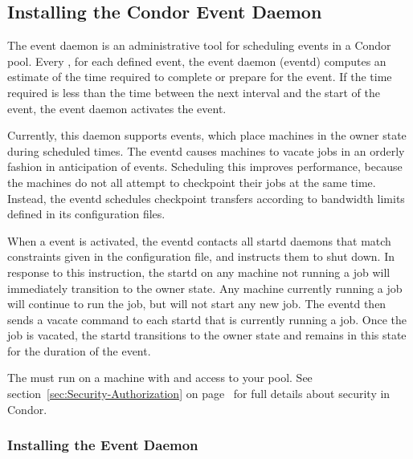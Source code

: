 \subsection{\label{sec:EventD}
Installing the Condor Event Daemon}


The event daemon is an administrative tool for scheduling events in a
Condor pool.
Every , for each defined event, the event
daemon (eventd) computes an estimate of the time required to complete or
prepare for the event.  If the time required is less than the time
between the next interval and the start of the event, the event daemon
activates the event.

Currently, this daemon supports  events, which place machines
in the owner state during scheduled times.
The eventd causes machines to vacate jobs in an orderly fashion
in anticipation of  events.
Scheduling this improves performance, because the machines
do not all attempt to checkpoint their jobs at the same time.
Instead, the eventd schedules checkpoint transfers according to
bandwidth limits defined in its configuration files.

When a  event is activated, the eventd contacts all startd
daemons
that match constraints given in the configuration file,
and instructs them to shut down.
In response to this instruction,
the startd on any machine not running a job will immediately transition to
the owner state.
Any machine currently running a job will continue to run the
job, but will not start any new job.
The eventd then sends a vacate command to each startd
that is currently running a job.
Once the job is vacated, the startd transitions to the
owner state and remains in this state for the duration of the
 event.

The  must run on a machine with 
 and  access to your pool.
See section~\ref{sec:Security-Authorization} on
page~\pageref{sec:Security-Authorization} for full details about
security in Condor.

\subsubsection{\label{sec:EventD-Installation}
Installing the Event Daemon} 

